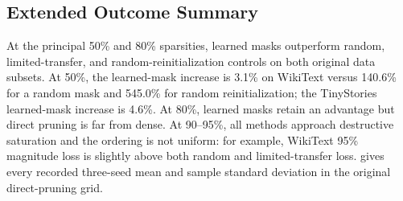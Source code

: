 \documentclass{article}
\begin{document}
\subsection{Extended Outcome Summary}

At the principal 50\% and 80\% sparsities, learned masks outperform random,
limited-transfer, and random-reinitialization controls on both original data
subsets. At 50\%, the learned-mask increase is 3.1\% on WikiText versus 140.6\%
for a random mask and 545.0\% for random reinitialization; the TinyStories
learned-mask increase is 4.6\%. At 80\%, learned masks retain an advantage but
direct pruning is far from dense. At 90--95\%, all methods approach destructive
saturation and the ordering is not uniform: for example, WikiText 95\%
magnitude loss is slightly above both random and limited-transfer loss.
 gives every recorded three-seed mean and
sample standard deviation in the original direct-pruning grid.

\begin{table}[t]
\centering
\scriptsize
\caption{Full normal-routing direct-pruning grid. Entries are validation loss,
mean $\pm$ sample SD over seeds 7, 17, and 29. ``0$\to$1 transfer'' changes only
expert 1's mask in each layer.}
\label{tab:app_direct_pruning_full}
\end{table}
\end{document}
